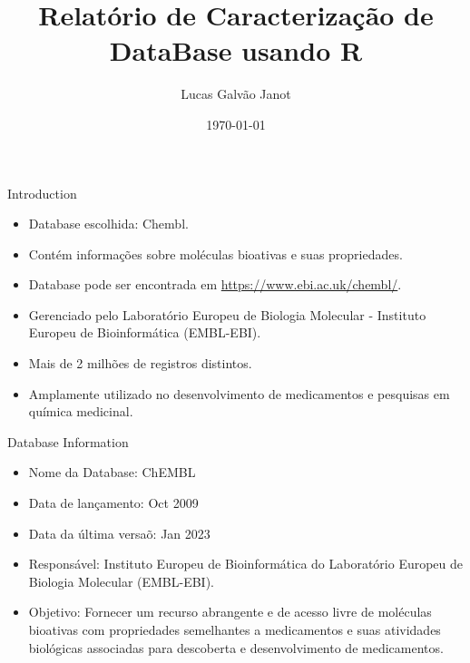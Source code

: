 \documentclass[8pt]{beamer}
\begin{document}
\title[Chembl Database]{\LARGE Relatório de Caracterização de DataBase usando R}
\author[Lucas Galvão Janot]{Lucas Galvão Janot}
\date{\today}

\begin{frame}
  \titlepage
\end{frame}

\begin{frame}{Introduction}
  \begin{itemize}
    \item Database escolhida: Chembl.
    \item Contém informações sobre moléculas bioativas e suas propriedades.
    \item Database pode ser encontrada em \url{https://www.ebi.ac.uk/chembl/}.
    \item Gerenciado pelo Laboratório Europeu de Biologia Molecular - Instituto Europeu de Bioinformática (EMBL-EBI).
    \item Mais de 2 milhões de registros distintos.
    \item Amplamente utilizado no desenvolvimento de medicamentos e pesquisas em química medicinal.
  \end{itemize}
\end{frame}

\begin{frame}{Database Information}
  \begin{itemize}
    \item Nome da Database: ChEMBL
    \item Data de lançamento: Oct 2009
    \item Data da última versaõ: Jan 2023
    \item Responsável: Instituto Europeu de Bioinformática do Laboratório Europeu de Biologia Molecular (EMBL-EBI).
    \item Objetivo: Fornecer um recurso abrangente e de acesso livre de moléculas bioativas com propriedades semelhantes a medicamentos e suas atividades biológicas associadas para descoberta e desenvolvimento de medicamentos.
  \end{itemize}
\end{frame}
\end{document}

